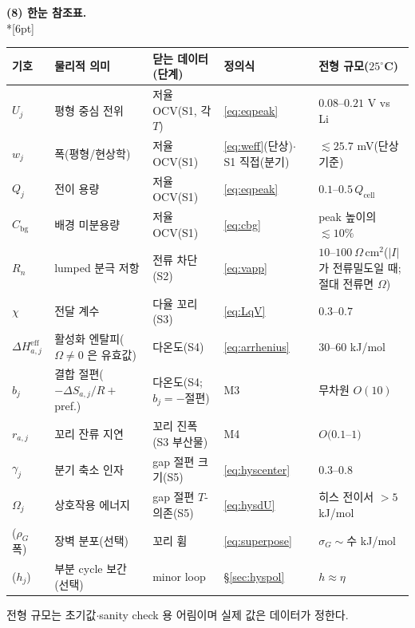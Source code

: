 \documentclass[11pt,a4paper]{article}
\newcommand{\eff}{\mathrm{eff}}
\newcommand{\cell}{\mathrm{cell}}
\newcommand{\bg}{\mathrm{bg}}
\begin{document}
\begin{center}
\textbf{(8) 한눈 참조표.}\\*[6pt]
\renewcommand{\arraystretch}{1.3}
\begin{tabular}{p{} p{} p{} p{} p{}}
\toprule
기호 & 물리적 의미 & 닫는 데이터(단계) & 정의식 & 전형 규모($25^\circ$C) \\
\midrule
$U_j$ & 평형 중심 전위 & 저율 OCV(S1, 각 $T$) & \eqref{eq:eqpeak} & $0.08$--$0.21$ V vs Li \\
$w_j$ & 폭(평형/현상학) & 저율 OCV(S1) & {\footnotesize \eqref{eq:weff}(단상)$\cdot$S1 직접(분기)} & $\lesssim25.7$ mV(단상 기준) \\
$Q_j$ & 전이 용량 & 저율 OCV(S1) & \eqref{eq:eqpeak} & $0.1$--$0.5\,Q_\cell$ \\
$C_\bg$ & 배경 미분용량 & 저율 OCV(S1) & \eqref{eq:cbg} & peak 높이의 $\lesssim10\%$ \\
$R_n$ & lumped 분극 저항 & 전류 차단(S2) & \eqref{eq:vapp} & $10$--$100\ \Omega\,$cm$^2$($|I|$ 가 전류밀도일 때; 절대 전류면 $\Omega$) \\
$\chi$ & 전달 계수 & 다율 꼬리(S3) & \eqref{eq:LqV} & $0.3$--$0.7$ \\
$\Delta H_{a,j}^{\eff}$ & 활성화 엔탈피($\Omega\ne0$ 은 유효값) & 다온도(S4) & \eqref{eq:arrhenius} & $30$--$60$ kJ/mol \\
$b_j$ & 결합 절편($-\Delta S_{a,j}/R+$pref.) & 다온도(S4; $b_j=-$절편) & M3 & 무차원 $O(10)$ \\
$r_{a,j}$ & 꼬리 잔류 지연 & 꼬리 진폭(S3 부산물) & M4 & $O(0.1$--$1)$ \\
$\gamma_j$ & 분기 축소 인자 & gap 절편 크기(S5) & \eqref{eq:hyscenter} & $0.3$--$0.8$ \\
$\Omega_j$ & 상호작용 에너지 & gap 절편 $T$-의존(S5) & \eqref{eq:hysdU} & 히스 전이서 $>5$ kJ/mol \\
($\rho_G$ 폭) & 장벽 분포(선택) & 꼬리 휨 & \eqref{eq:superpose} & $\sigma_G\sim$수 kJ/mol \\
($h_j$) & 부분 cycle 보간(선택) & minor loop & \S\ref{sec:hyspol} & $h\approx\eta$ \\
\bottomrule
\end{tabular}
\end{center}
전형 규모는 초기값$\cdot$sanity check 용 어림이며 실제 값은 데이터가 정한다.
\end{document}
